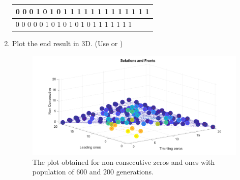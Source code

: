 \documentclass[11pt, a4paper]{article}
\begin{document}
\begin{enumerate}
\begin{table}[http]
\begin{tabular}{|l|}
			0     0     0     1     0     1     0     1     1     1     1     1     1     1     1     1     1     1     1     1 \\ \hline
			0     0     0     0     0     1     0     1     0     1     0     1     0     1     1     1     1     1     1     1 \\ \hline
		\end{tabular}
	\end{table}
	\item Plot the end result in 3D. (Use  or )
			\begin{figure}
			\centering
			\includegraphics[width=\textwidth]{code/Extra_credit}
			\caption{The plot obtained for non-consecutive zeros and ones with population of 600 and 200 generations.}
			\label{extracredit}
		\end{figure}
\end{enumerate}
\end{document}
